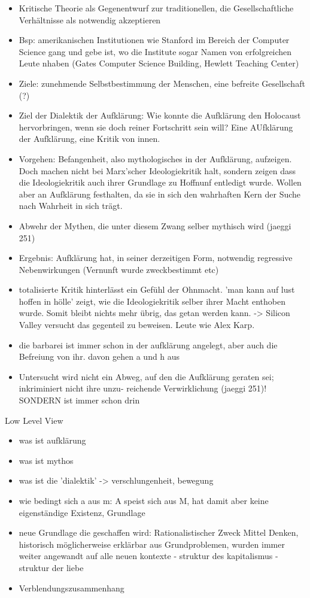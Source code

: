 \documentclass[a4paper, 12pt]{article}
\begin{document}
\begin{onehalfspace}
\begin{itemize}
  \item Kritische Theorie als Gegenentwurf zur traditionellen, die Gesellschaftliche Verhältnisse als notwendig akzeptieren
  \item Bsp: amerikanischen Institutionen wie Stanford im 			Bereich der Computer Science gang und gebe ist, wo die Institute sogar Namen			von erfolgreichen Leute nhaben (Gates Computer Science Building, Hewlett 			Teaching Center) 
  \item Ziele: zunehmende Selbstbestimmung der Menschen, eine befreite Gesellschaft (?)
  \item Ziel der Dialektik der Aufklärung: Wie konnte die Aufklärung den Holocaust hervorbringen, wenn sie doch reiner Fortschritt sein will? Eine AUfklärung der Aufklärung, eine Kritik von innen.
  \item Vorgehen: Befangenheit, also mythologisches in der Aufklärung, aufzeigen. Doch machen nicht bei Marx'scher Ideologiekritik halt, sondern zeigen dass die Ideologiekritik auch ihrer Grundlage zu Hoffnunf entledigt wurde. Wollen aber an Aufklärung festhalten, da sie in sich den wahrhaften Kern der Suche nach Wahrheit in sich trägt.
  \item Abwehr der Mythen, die unter diesem Zwang selber mythisch wird (jaeggi 251)
  \item Ergebnis: Aufklärung hat, in seiner derzeitigen Form, notwendig regressive 				Nebenwirkungen (Vernunft wurde zweckbestimmt etc)
  \item totalisierte Kritik hinterlässt ein Gefühl der Ohnmacht. 'man kann auf lust hoffen in hölle' zeigt, wie die Ideologiekritik selber ihrer Macht enthoben wurde. Somit bleibt nichts mehr übrig, das getan werden kann. -> Silicon Valley versucht das gegenteil zu beweisen. Leute wie Alex Karp.
  \item die barbarei ist immer schon in der aufklärung angelegt, aber auch die Befreiung von ihr. davon gehen a und h aus
  \item Untersucht wird nicht ein Abweg, auf den die Aufklärung geraten sei; inkriminiert nicht ihre unzu- reichende Verwirklichung (jaeggi 251)! SONDERN ist immer schon drin
\end{itemize}

Low Level View

\begin{itemize}
  \item was ist aufklärung
  \item was ist mythos
  \item was ist die 'dialektik' -> verschlungenheit, bewegung
  \item wie bedingt sich a aus m:  A speist sich aus M, hat damit aber keine eigenständige Existenz, Grundlage
  \item neue Grundlage die geschaffen wird: Rationalistischer Zweck Mittel Denken, historisch möglicherweise erklärbar aus Grundproblemen, wurden immer weiter angewandt auf alle neuen kontexte - struktur des kapitalismus - struktur der liebe
  \item Verblendungszusammenhang
\end{itemize}



\end{onehalfspace}
\end{document}
